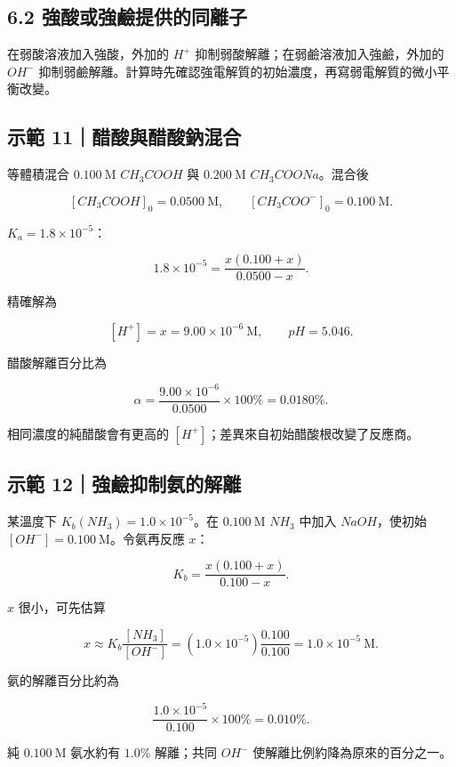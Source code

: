 \documentclass[11pt,a4paper]{article}
\begin{document}
\subsection{6.2 強酸或強鹼提供的同離子}\label{ux5f37ux9178ux6216ux5f37ux9e7cux63d0ux4f9bux7684ux540cux96e2ux5b50}

在弱酸溶液加入強酸，外加的 \(H^+\) 抑制弱酸解離；在弱鹼溶液加入強鹼，外加的 \(OH^-\) 抑制弱鹼解離。計算時先確認強電解質的初始濃度，再寫弱電解質的微小平衡改變。

\begin{HandoutWorkedExample}

\subsection{示範 11｜醋酸與醋酸鈉混合}\label{ux793aux7bc4-11ux918bux9178ux8207ux918bux9178ux9209ux6df7ux5408}

等體積混合 \(0.100\ \mathrm M\) \(CH_3COOH\) 與 \(0.200\ \mathrm M\) \(CH_3COONa\)。混合後

\[
[CH_3COOH]_0=0.0500\ \mathrm M,\qquad
[CH_3COO^-]_0=0.100\ \mathrm M.
\]

\(K_a=1.8\times10^{-5}\)：

\[
1.8\times10^{-5}
=\frac{x(0.100+x)}{0.0500-x}.
\]

精確解為

\[
[H^+]=x=9.00\times10^{-6}\ \mathrm M,
\qquad pH=5.046.
\]

醋酸解離百分比為

\[
\alpha=\frac{9.00\times10^{-6}}{0.0500}\times100\%
=0.0180\%.
\]

相同濃度的純醋酸會有更高的 \([H^+]\)；差異來自初始醋酸根改變了反應商。

\end{HandoutWorkedExample}

\begin{HandoutWorkedExample}

\subsection{示範 12｜強鹼抑制氨的解離}\label{ux793aux7bc4-12ux5f37ux9e7cux6291ux5236ux6c28ux7684ux89e3ux96e2}

某溫度下 \(K_b(NH_3)=1.0\times10^{-5}\)。在 \(0.100\ \mathrm M\) \(NH_3\) 中加入 \(NaOH\)，使初始 \([OH^-]=0.100\ \mathrm M\)。令氨再反應 \(x\)：

\[
K_b=\frac{x(0.100+x)}{0.100-x}.
\]

\(x\) 很小，可先估算

\[
x\approx K_b\frac{[NH_3]}{[OH^-]}
=(1.0\times10^{-5})\frac{0.100}{0.100}
=1.0\times10^{-5}\ \mathrm M.
\]

氨的解離百分比約為

\[
\frac{1.0\times10^{-5}}{0.100}\times100\%=0.010\%.
\]

純 \(0.100\ \mathrm M\) 氨水約有 \(1.0\%\) 解離；共同 \(OH^-\) 使解離比例約降為原來的百分之一。

\end{HandoutWorkedExample}
\end{document}

